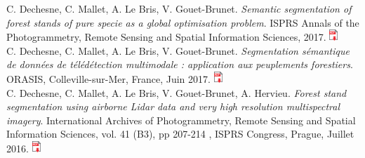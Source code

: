 C. Dechesne, C. Mallet, A. Le Bris, V. Gouet-Brunet. \textit{Semantic segmentation of forest stands of pure specie as a global optimisation problem}. ISPRS Annals of the Photogrammetry, Remote Sensing and Spatial Information Sciences, 2017. \href{http://recherche.ign.fr/labos/matis/pdf/articles_conf/2017/workshop_hanover_2017_dechesne.pdf}{\includegraphics[height=12pt]{Appendices/ic_pdf.jpg}} \\

C. Dechesne, C. Mallet, A. Le Bris, V. Gouet-Brunet. \textit{Segmentation sémantique de données de télédétection multimodale : application aux peuplements forestiers}. ORASIS, Colleville-sur-Mer, France, Juin 2017. \href{http://recherche.ign.fr/labos/matis/pdf/articles_conf/2017/orasis2017_Dechesne.pdf}{\includegraphics[height=12pt]{Appendices/ic_pdf.jpg}} \\

C. Dechesne, C. Mallet, A. Le Bris, V. Gouet-Brunet, A. Hervieu. \textit{Forest stand segmentation using airborne Lidar data and very high resolution multispectral imagery}. International Archives of Photogrammetry, Remote Sensing and Spatial Information Sciences, vol. 41 (B3), pp 207-214 , ISPRS Congress, Prague, Juillet 2016. \href{http://recherche.ign.fr/labos/matis/pdf/articles_conf/2016/dechesne_isprs_2016.pdf}{\includegraphics[height=12pt]{Appendices/ic_pdf.jpg}} \\

\stopcontents[chapters]